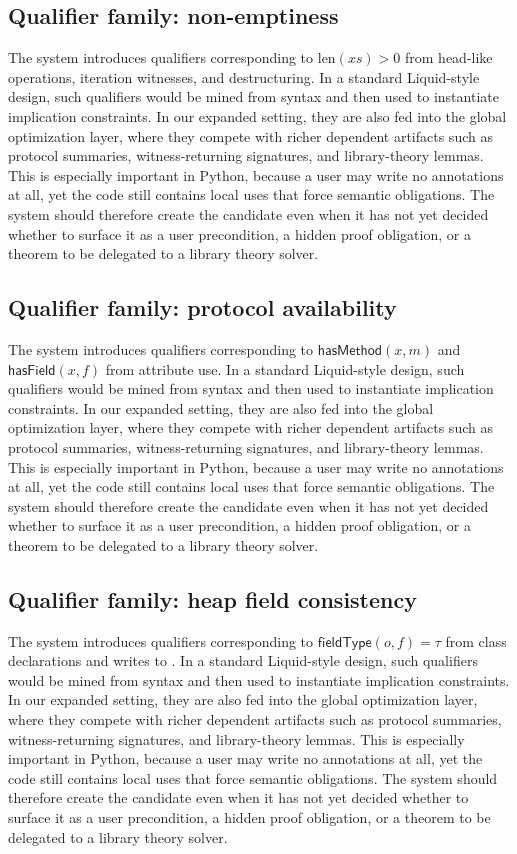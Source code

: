\documentclass[11pt]{article}
\newcommand{\py}[1]{\texttt{\detokenize{#1}}}
\theoremstyle{definition}
\theoremstyle{plain}
\begin{document}
\subsection{Qualifier family: non-emptiness}
The system introduces qualifiers corresponding to \(\mathrm{len}(xs) > 0\) from head-like operations, iteration witnesses, and destructuring. In a standard
Liquid-style design, such qualifiers would be mined from syntax and then used
to instantiate implication constraints. In our expanded setting, they are also
fed into the global optimization layer, where they compete with richer
dependent artifacts such as protocol summaries, witness-returning signatures,
and library-theory lemmas. This is especially important in Python, because a
user may write no annotations at all, yet the code still contains local uses
that force semantic obligations. The system should therefore create the
candidate even when it has not yet decided whether to surface it as a user
precondition, a hidden proof obligation, or a theorem to be delegated to a
library theory solver.

\subsection{Qualifier family: protocol availability}
The system introduces qualifiers corresponding to \(\mathsf{hasMethod}(x,m)\) and \(\mathsf{hasField}(x,f)\) from attribute use. In a standard
Liquid-style design, such qualifiers would be mined from syntax and then used
to instantiate implication constraints. In our expanded setting, they are also
fed into the global optimization layer, where they compete with richer
dependent artifacts such as protocol summaries, witness-returning signatures,
and library-theory lemmas. This is especially important in Python, because a
user may write no annotations at all, yet the code still contains local uses
that force semantic obligations. The system should therefore create the
candidate even when it has not yet decided whether to surface it as a user
precondition, a hidden proof obligation, or a theorem to be delegated to a
library theory solver.

\subsection{Qualifier family: heap field consistency}
The system introduces qualifiers corresponding to \(\mathsf{fieldType}(o,f)=\tau\) from class declarations and writes to \py{self.f}. In a standard
Liquid-style design, such qualifiers would be mined from syntax and then used
to instantiate implication constraints. In our expanded setting, they are also
fed into the global optimization layer, where they compete with richer
dependent artifacts such as protocol summaries, witness-returning signatures,
and library-theory lemmas. This is especially important in Python, because a
user may write no annotations at all, yet the code still contains local uses
that force semantic obligations. The system should therefore create the
candidate even when it has not yet decided whether to surface it as a user
precondition, a hidden proof obligation, or a theorem to be delegated to a
library theory solver.
\end{document}
